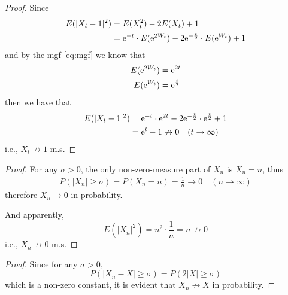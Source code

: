 \documentclass{homework}
\begin{document}
\begin{subproblem}
        \item
        \begin{proof}
            Since
            \[\begin{aligned}
                E(|X_t-1|^2)&=E(X_t^2)-2E(X_t)+1\\
                &=\mathrm e^{-t}\cdot E(\mathrm e^{2W_t})
                  -2\mathrm e^{-\frac t2}\cdot E(\mathrm e^{W_t})+1
            \end{aligned}\]
            and by the mgf \cref{eq:mgf} we know that
            \[\begin{aligned}
                E(\mathrm e^{2W_t})&=\mathrm e^{2t}\\
                E(\mathrm e^{W_t})&=\mathrm e^{\frac t2}\\
            \end{aligned}\]
            then we have that
            \[\begin{aligned}
                E(|X_t-1|^2)&=\mathrm e^{-t}\cdot\mathrm e^{2t}
                -2\mathrm e^{-\frac t2}\cdot\mathrm e^{\frac t2}+1\\
                &=\mathrm e^t-1\not\to 0\quad(t\to\infty)
            \end{aligned}\]
            i.e., $X_t\not\to 1$ m.s.
        \end{proof}

        \item

        \item
        \begin{proof}
            For any $\sigma>0$, the only non-zero-measure part
            of $X_n$ is $X_n=n$, thus
            \[\begin{aligned}
                P(|X_n|\geq\sigma)=P(X_n=n)=\frac{1}{n}\to 0
                \quad(n\to\infty)
            \end{aligned}\]
            therefore $X_n\to 0$ in probability.

            And apparently,
            \[E(|X_n|^2)=n^2\cdot\frac{1}{n}=n\not\to 0\]
            i.e., $X_n\not\to 0$ m.s.
        \end{proof}

        \item

        \item

        \item
        \begin{proof}
            Since for any $\sigma>0$,
            \[P(|X_n-X|\geq\sigma)=P(2|X|\geq\sigma)\]
            which is a non-zero constant, it is evident that
            $X_n\not\to X$ in probability.
        \end{proof}
    \end{subproblem}
\end{document}
